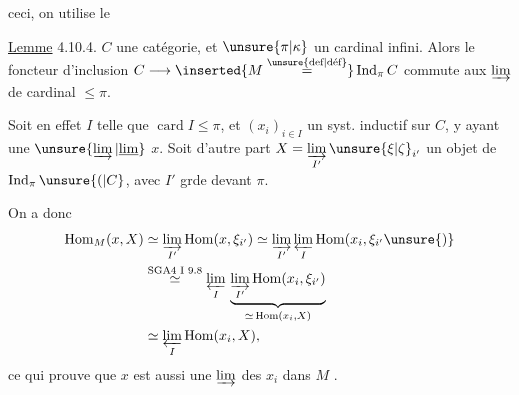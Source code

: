 ceci, on utilise le

\uline{Lemme} 4.10.4.  $C$ une catégorie, et $\unsure{\pi|\kappa}$ un cardinal infini. Alors le foncteur d'inclusion $C\longrightarrow\inserted{M\overset{\unsure{\text{def}|\text{déf}}}{=}}\operatorname{Ind}_{\pi} C$ commute aux $\varinjlim$ de cardinal $\leq\pi$.
\margin{\rule{0.4pt}{4\baselineskip}}

Soit en effet $I$ telle que $\operatorname{card}I\leq\pi$, et  $(x_i)_{i\in I}$ un syst. inductif\unsure{$_{\pi}$} sur $C$, y ayant une $\unsure{\varinjlim|\underline{\lim}}$ $x$. Soit d'autre part $X=\underset{I'}{\varinjlim}\,\unsure{\xi|\zeta}_{i'}$ un objet de $\operatorname{Ind}_{\pi}\unsure{(|C}$, avec $I'$ grde devant $\pi$.

On a donc
\[
 \begin{aligned}
 \mathrm{Hom}_{M}(x,X)&\simeq\underset{I'}{\varinjlim}\,\mathrm{Hom}(x,\xi_{i'})
 \simeq\underset{I'}{\varinjlim}\,\underset{I}{\varprojlim}\,\mathrm{Hom}(x_i,\xi_{i'}\unsure{)}\\
 &\overset{\text{SGA4 I 9.8}}{\simeq}\underset{I}{\varprojlim}\,
 \underbrace{\underset{I'}{\varinjlim}\,\mathrm{Hom}(x_i,\xi_{i'})}_{\simeq\,\mathrm{Hom}(x_i,X)}\\
 &\simeq\underset{I}{\varprojlim}\,\mathrm{Hom}(x_i,X),
 \end{aligned}
\]
ce qui prouve que $x$ est aussi une $\varinjlim$ des $x_i$ dans $M$ .
